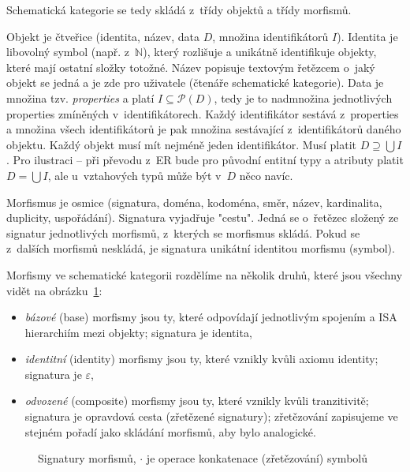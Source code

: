 Schematická kategorie se tedy skládá z~třídy objektů a třídy morfismů.

Objekt je čtveřice (identita, název, data $D$, množina identifikátorů $I$).
Identita je libovolný symbol (např. z~$\mathbb N$), který rozlišuje a unikátně identifikuje objekty, které mají ostatní složky totožné.
Název popisuje textovým řetězcem o~jaký objekt se jedná a je zde pro uživatele (čtenáře schematické kategorie).
Data je množina tzv. \emph{properties} a platí $I\subseteq \mathcal P(D)$, tedy je to nadmnožina jednotlivých properties zmíněných v~identifikátorech.
Každý identifikátor sestává z~properties a množina všech identifikátorů je pak množina sestávající z~identifikátorů daného objektu.
Každý objekt musí mít nejméně jeden identifikátor.
Musí platit $D\supseteq \bigcup I$.
Pro ilustraci -- při převodu z~ER bude pro původní entitní typy a atributy platit $D = \bigcup I$, ale u~vztahových typů může být v~$D$ něco navíc.

Morfismus je osmice (signatura, doména, kodoména, směr, název, kardinalita, duplicity, uspořádání).
Signatura vyjadřuje "cestu".
Jedná se o~řetězec složený ze signatur jednotlivých morfismů, z~kterých se morfismus skládá.
Pokud se z~dalších morfismů neskládá, je signatura unikátní identitou morfismu (symbol).

Morfismy ve schematické kategorii rozdělíme na několik druhů, které jsou všechny vidět na obrázku~\ref{fig:morphism-signatures}:
\begin{itemize}
  \item \emph{bázové} (base) morfismy jsou ty, které odpovídají jednotlivým spojením a ISA hierarchiím mezi objekty; signatura je identita,
  \item \emph{identitní} (identity) morfismy jsou ty, které vznikly kvůli axiomu identity; signatura je $\varepsilon$,
  \item \emph{odvozené} (composite) morfismy jsou ty, které vznikly kvůli tranzitivitě; signatura je opravdová cesta (zřetězené signatury); zřetězování zapisujeme ve stejném pořadí jako skládání morfismů, aby bylo analogické.
\end{itemize}

\begin{figure}[!htb]
  \centering
  \caption{Signatury morfismů, $\cdot$ je operace konkatenace (zřetězování) symbolů}
  \label{fig:morphism-signatures}
\end{figure}
